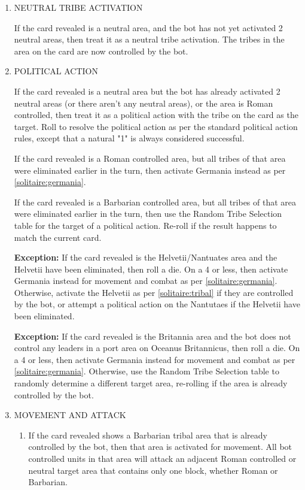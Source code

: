 \renewcommand{\labelenumii}{\alph{enumii}.}
\begin{enumerate}
  \item NEUTRAL TRIBE ACTIVATION

  If the card revealed is a neutral area, and the bot has not yet activated 2 neutral areas, then treat it as a neutral tribe activation. The tribes in the area on the card are now controlled by the bot.

  \item POLITICAL ACTION
  
  If the card revealed is a neutral area but the bot has already activated 2 neutral areas (or there aren't any neutral areas), or the area is Roman controlled, then treat it as a political action with the tribe on the card as the target. Roll to resolve the political action as per the standard political action rules, except that a natural "1" is always considered successful.
  
  If the card revealed is a Roman controlled area, but all tribes of that area were eliminated earlier in the turn, then activate Germania instead as per \ref{solitaire:germania}.
  
  If the card revealed is a Barbarian controlled area, but all tribes of that area were eliminated earlier in the turn, then use the Random Tribe Selection table for the target of a political action. Re-roll if the result happens to match the current card.
  
  \textbf{Exception:} If the card revealed is the Helvetii/Nantuates area and the Helvetii have been eliminated, then roll a die. On a 4 or less, then activate Germania instead for movement and combat as per \ref{solitaire:germania}. Otherwise, activate the Helvetii as per \ref{solitaire:tribal} if they are controlled by the bot, or attempt a political action on the Nantutaes if the Helvetii have been eliminated.
  
  \textbf{Exception:} If the card revealed is the Britannia area and the bot does not control any leaders in a port area on Oceanus Britannicus, then roll a die. On a 4 or less, then activate Germania instead for movement and combat as per \ref{solitaire:germania}. Otherwise, use the Random Tribe Selection table to randomly determine a different target area, re-rolling if the area is already controlled by the bot.

  \item MOVEMENT AND ATTACK

  \begin{enumerate}[leftmargin=0in]
    \item \label{solitaire:tribal} If the card revealed shows a Barbarian tribal area that is already controlled by the bot, then that area is activated for movement. All bot controlled units in that area will attack an adjacent Roman controlled or neutral target area that contains only one block, whether Roman or Barbarian.
    

\end{enumerate}
\end{enumerate}
